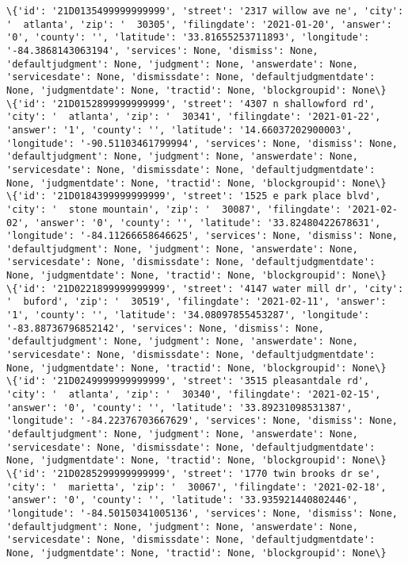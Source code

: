 \documentclass[11pt]{article}
\begin{document}
\begin{Verbatim}[commandchars=\\\{\}]
\{'id': '21D0135499999999999', 'street': '2317 willow ave ne', 'city': '  atlanta', 'zip': '  30305', 'filingdate': '2021-01-20', 'answer': '0', 'county': '', 'latitude': '33.81655253711893', 'longitude': '-84.3868143063194', 'services': None, 'dismiss': None, 'defaultjudgment': None, 'judgment': None, 'answerdate': None, 'servicesdate': None, 'dismissdate': None, 'defaultjudgmentdate': None, 'judgmentdate': None, 'tractid': None, 'blockgroupid': None\}
\{'id': '21D0152899999999999', 'street': '4307 n shallowford rd', 'city': '  atlanta', 'zip': '  30341', 'filingdate': '2021-01-22', 'answer': '1', 'county': '', 'latitude': '14.66037202900003', 'longitude': '-90.51103461799994', 'services': None, 'dismiss': None, 'defaultjudgment': None, 'judgment': None, 'answerdate': None, 'servicesdate': None, 'dismissdate': None, 'defaultjudgmentdate': None, 'judgmentdate': None, 'tractid': None, 'blockgroupid': None\}
\{'id': '21D0184399999999999', 'street': '1525 e park place blvd', 'city': '  stone mountain', 'zip': '  30087', 'filingdate': '2021-02-02', 'answer': '0', 'county': '', 'latitude': '33.82480422678631', 'longitude': '-84.11266658646625', 'services': None, 'dismiss': None, 'defaultjudgment': None, 'judgment': None, 'answerdate': None, 'servicesdate': None, 'dismissdate': None, 'defaultjudgmentdate': None, 'judgmentdate': None, 'tractid': None, 'blockgroupid': None\}
\{'id': '21D0221899999999999', 'street': '4147 water mill dr', 'city': '  buford', 'zip': '  30519', 'filingdate': '2021-02-11', 'answer': '1', 'county': '', 'latitude': '34.08097855453287', 'longitude': '-83.88736796852142', 'services': None, 'dismiss': None, 'defaultjudgment': None, 'judgment': None, 'answerdate': None, 'servicesdate': None, 'dismissdate': None, 'defaultjudgmentdate': None, 'judgmentdate': None, 'tractid': None, 'blockgroupid': None\}
\{'id': '21D0249999999999999', 'street': '3515 pleasantdale rd', 'city': '  atlanta', 'zip': '  30340', 'filingdate': '2021-02-15', 'answer': '0', 'county': '', 'latitude': '33.89231098531387', 'longitude': '-84.22376703667629', 'services': None, 'dismiss': None, 'defaultjudgment': None, 'judgment': None, 'answerdate': None, 'servicesdate': None, 'dismissdate': None, 'defaultjudgmentdate': None, 'judgmentdate': None, 'tractid': None, 'blockgroupid': None\}
\{'id': '21D0285299999999999', 'street': '1770 twin brooks dr se', 'city': '  marietta', 'zip': '  30067', 'filingdate': '2021-02-18', 'answer': '0', 'county': '', 'latitude': '33.935921440802446', 'longitude': '-84.50150341005136', 'services': None, 'dismiss': None, 'defaultjudgment': None, 'judgment': None, 'answerdate': None, 'servicesdate': None, 'dismissdate': None, 'defaultjudgmentdate': None, 'judgmentdate': None, 'tractid': None, 'blockgroupid': None\}

\end{Verbatim}
\end{document}

